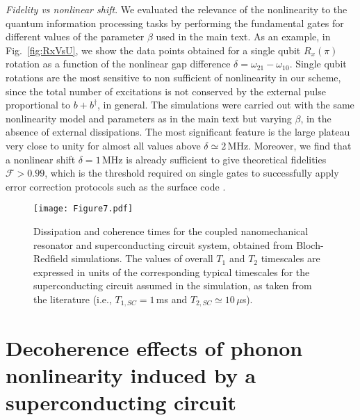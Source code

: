 \documentclass[aps,twocolumn,groupedaddress,superscriptaddress,floatfix,amsmath,amssymb,prb]{revtex4-1}
\begin{document}
\textit{Fidelity vs nonlinear shift}. We evaluated the relevance of the nonlinearity to the quantum information processing tasks by performing the fundamental gates for different values of the parameter $\beta$ used in the main text. As an example, in Fig.~\ref{fig:RxVsU}, we show the data points obtained for a single qubit $R_x(\pi)$ rotation as a function of the nonlinear gap difference $\delta = \omega_{21}-\omega_{10}$. Single qubit rotations are the most sensitive to non sufficient of nonlinearity in our scheme, since the total number of excitations is not conserved by the external pulse proportional to $b+b^\dagger$, in general. The simulations were carried out with the same nonlinearity model and parameters as in the main text but varying $\beta$, in the absence of external dissipations. The most significant feature is the large plateau very close to unity for almost all values above $\delta \simeq 2\,$MHz. Moreover, we find that a nonlinear shift $\delta = 1\,$MHz is already sufficient to give theoretical fidelities $\mathcal{F}>0.99$, which is the threshold required on single gates to successfully apply error correction protocols such as the surface code \cite{Barends2014}.  \\


\begin{figure*}
\centering
\texttt{[image: Figure7.pdf]} 
\caption{Dissipation and coherence times for the coupled nanomechanical resonator and superconducting circuit system, obtained from Bloch-Redfield simulations. The values of overall $T_1$ and $T_2$ timescales are expressed in units of the corresponding {typical} timescales for the superconducting circuit assumed in the simulation, as taken from the literature (i.e., ${T}_{1,SC} = 1\,$ms and ${T}_{2,SC} \simeq 10\,\mu$s).}
\label{fig:T1T2}
\end{figure*}

\section{Decoherence effects of phonon nonlinearity induced by a superconducting circuit} 
\label{app:Single-Ph-Nonlin}
\end{document}
